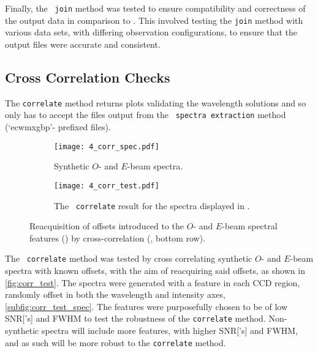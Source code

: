 Finally, the \stops\ \texttt{join} method was tested to ensure compatibility and correctness of the output data in comparison to \polsalt.
This involved testing the \texttt{join} method with various data sets, with differing observation configurations, to ensure that the output files were accurate and consistent.

\subsection{Cross Correlation Checks} \label{subsec:test_corr}

The \texttt{correlate} method returns plots validating the wavelength solutions and so only has to accept the files output from the \polsalt\ \texttt{spectra extraction}  method (`ecwmxgbp'- prefixed files).

\begin{figure}
    \centering
    \begin{subfigure}[b]{\textwidth}
        \centering
        \texttt{[image: 4\_corr\_spec.pdf]}
        \caption{Synthetic $O$- and $E$-beam spectra.}
        \label{subfig:corr_test_spec}
    \end{subfigure}
    \hfill
    \begin{subfigure}[b]{\textwidth}
        \centering
        \texttt{[image: 4\_corr\_test.pdf]}
        \caption{The \stops\ \texttt{correlate} result for the spectra displayed in .}
        \label{subfig:corr_test_corr}
    \end{subfigure}
    \caption{Reacquisition of offsets introduced to the $O$- and $E$-beam spectral features () by cross-correlation (, bottom row).}
    \label{fig:corr_test}
\end{figure}

The \stops\ \texttt{correlate} method was tested by cross correlating synthetic $O$- and $E$-beam spectra with known offsets, with the aim of reacquiring said offsets, as shown in \autoref{fig:corr_test}.
The spectra were generated with a feature in each \gls{CCD} region, randomly offset in both the wavelength and intensity axes, \autoref{subfig:corr_test_spec}.
The features were purposefully chosen to be of low \gls{SNR}['s] and \gls{FWHM} to test the robustness of the \texttt{correlate} method.
Non-synthetic spectra will include more features, with higher \gls{SNR}['s] and \gls{FWHM}, and as such will be more robust to the \texttt{correlate} method.

